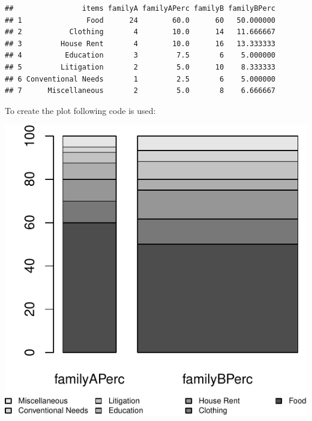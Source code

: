 \documentclass[]{article}
\newenvironment{Shaded}{\begin{snugshade}}{\end{snugshade}}
\newcommand{\DataTypeTok}[1]{\textcolor[rgb]{0.13,0.29,0.53}{#1}}
\newcommand{\DecValTok}[1]{\textcolor[rgb]{0.00,0.00,0.81}{#1}}
\newcommand{\FloatTok}[1]{\textcolor[rgb]{0.00,0.00,0.81}{#1}}
\newcommand{\KeywordTok}[1]{\textcolor[rgb]{0.13,0.29,0.53}{\textbf{#1}}}
\newcommand{\NormalTok}[1]{#1}
\newcommand{\OperatorTok}[1]{\textcolor[rgb]{0.81,0.36,0.00}{\textbf{#1}}}
\newcommand{\StringTok}[1]{\textcolor[rgb]{0.31,0.60,0.02}{#1}}
\begin{document}
\begin{verbatim}
##                items familyA familyAPerc familyB familyBPerc
## 1               Food      24        60.0      60   50.000000
## 2           Clothing       4        10.0      14   11.666667
## 3         House Rent       4        10.0      16   13.333333
## 4          Education       3         7.5       6    5.000000
## 5         Litigation       2         5.0      10    8.333333
## 6 Conventional Needs       1         2.5       6    5.000000
## 7      Miscellaneous       2         5.0       8    6.666667
\end{verbatim}

To create the plot following code is used:

\begin{Shaded}
\end{Shaded}

\includegraphics{chapt2_files/figure-latex/unnamed-chunk-3-1.pdf}
\end{document}
